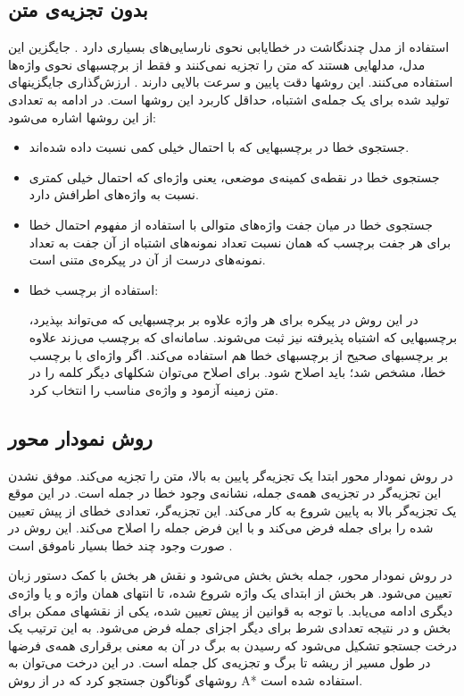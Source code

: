 \documentclass{report}
\begin{document}
\subsection{بدون تجزیه‌ی متن}
استفاده از مدل چند‌نگاشت در خطایابی نحوی نارسایی‌های بسیاری دارد \cite{ct7}. جایگزین این مدل، مدلهایی هستند که متن را تجزیه نمی‌کنند و فقط از برچسبهای نحوی واژه‌ها استفاده می‌کنند. این روشها دقت پایین و سرعت بالایی دارند \cite{ct8}. ارزش‌گذاری جایگزینهای تولید شده برای یک جمله‌ی اشتباه، حداقل کاربرد این روشها است. در ادامه به تعدادی از این روشها اشاره می‌شود:
\begin{itemize}
\item
جستجوی‌ خطا در برچسبهایی که با احتمال خیلی کمی نسبت داده شده‌اند.
\item
جستجوی خطا در نقطه‌ی کمینه‌ی موضعی، یعنی واژه‌ای که احتمال خیلی کمتری نسبت به واژه‌های اطرافش دارد.
\item
جستجوی خطا در میان جفت واژه‌های متوالی با استفاده از مفهوم احتمال خطا برای هر جفت برچسب که همان نسبت تعداد نمونه‌های اشتباه از آن جفت به تعداد نمونه‌های درست از آن در پیکره‌ی متنی است.
\item
استفاده از برچسب خطا:

در این روش در پیکره برای هر واژه علاوه بر برچسبهایی که می‌تواند بپذیرد، برچسبهایی که اشتباه پذیرفته نیز ثبت می‌شوند. سامانه‌ای که برچسب می‌زند علاوه بر برچسبهای صحیح از برچسبهای خطا هم استفاده می‌کند. اگر واژه‌ای با برچسب خطا، مشخص شد؛ باید اصلاح شود. برای اصلاح می‌توان شکلهای دیگر کلمه را در متن زمینه آزمود و واژه‌ی مناسب را انتخاب کرد.
\end{itemize}

\subsection{روش نمودار محور}
در روش نمودار محور ابتدا یک تجزیه‌گر پایین به بالا، متن را تجزیه می‌کند. موفق نشدن این تجزیه‌گر در تجزیه‌ی همه‌ی جمله، نشانه‌ی وجود خطا در جمله است. در این موقع یک تجزیه‌گر بالا به پایین شروع به کار می‌کند. این تجزیه‌گر، تعدادی خطای از پیش تعیین شده را برای جمله فرض می‌کند و با این فرض جمله را اصلاح می‌کند. این روش در صورت وجود چند خطا بسیار ناموفق است \cite{ct9}.

در روش نمودار محور، جمله بخش بخش می‌شود و نقش هر بخش با کمک دستور زبان تعیین می‌شود. هر بخش از ابتدای یک واژه شروع شده، تا انتهای همان واژه و یا واژه‌ی دیگری ادامه می‌یابد. با توجه به قوانین از پیش تعیین شده، یکی از نقشهای ممکن برای بخش و در نتیجه تعدادی شرط برای دیگر اجزای جمله فرض می‌شود. به این ترتیب یک درخت جستجو تشکیل می‌شود که رسیدن به برگ در آن به معنی برقراری همه‌ی فرضها در طول مسیر از ریشه تا برگ و تجزیه‌ی کل جمله است. در این درخت می‌توان به روشهای گوناگون جستجو کرد که در \cite{ct10} از روش A* استفاده شده است.
\end{document}
